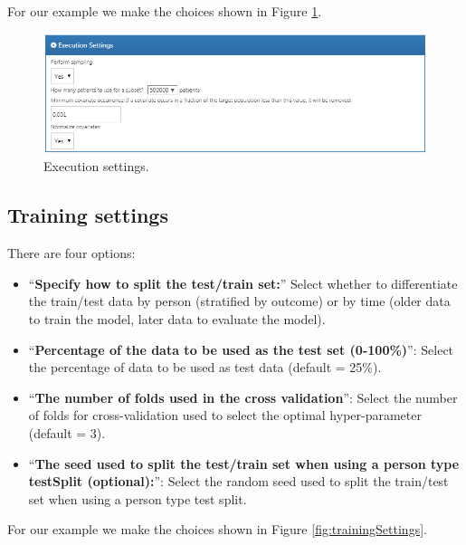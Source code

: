 \documentclass[11pt]{book}
\providecommand{\tightlist}{%
  \setlength{\itemsep}{0pt}\setlength{\parskip}{0pt}}
\theoremstyle{definition}
\theoremstyle{definition}
\theoremstyle{definition}
\theoremstyle{remark}
\begin{document}
For our example we make the choices shown in Figure \ref{fig:executionSettings}.

\begin{figure}

{\centering \includegraphics[width=1\linewidth]{images/PatientLevelPrediction/executionSettings} 

}

\caption{Execution settings.}\label{fig:executionSettings}
\end{figure}

\hypertarget{training-settings}{%
\subsection{Training settings}\label{training-settings}}

There are four options:

\begin{itemize}
\tightlist
\item
  ``\textbf{Specify how to split the test/train set:}'' Select whether to differentiate the train/test data by person (stratified by outcome) or by time (older data to train the model, later data to evaluate the model).
\item
  ``\textbf{Percentage of the data to be used as the test set (0-100\%)}'': Select the percentage of data to be used as test data (default = 25\%).
\item
  ``\textbf{The number of folds used in the cross validation}'': Select the number of folds for cross-validation used to select the optimal hyper-parameter (default = 3).
\item
  ``\textbf{The seed used to split the test/train set when using a person type testSplit (optional):}'': Select the random seed used to split the train/test set when using a person type test split.
\end{itemize}

For our example we make the choices shown in Figure \ref{fig:trainingSettings}.
\end{document}
